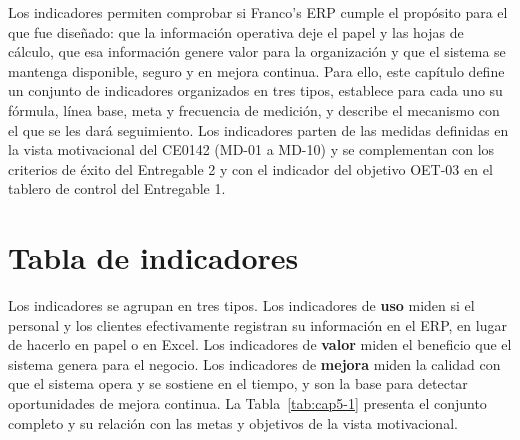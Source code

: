 
Los indicadores permiten comprobar si Franco's ERP cumple el propósito para el que fue diseñado: que la información operativa deje el papel y las hojas de cálculo, que esa información genere valor para la organización y que el sistema se mantenga disponible, seguro y en mejora continua. Para ello, este capítulo define un conjunto de indicadores organizados en tres tipos, establece para cada uno su fórmula, línea base, meta y frecuencia de medición, y describe el mecanismo con el que se les dará seguimiento. Los indicadores parten de las medidas definidas en la vista motivacional del CE0142 (MD-01 a MD-10) y se complementan con los criterios de éxito del Entregable 2 y con el indicador del objetivo OET-03 en el tablero de control del Entregable 1.

\section{Tabla de indicadores}


Los indicadores se agrupan en tres tipos. Los indicadores de \textbf{uso} miden si el personal y los clientes efectivamente registran su información en el ERP, en lugar de hacerlo en papel o en Excel. Los indicadores de \textbf{valor} miden el beneficio que el sistema genera para el negocio. Los indicadores de \textbf{mejora} miden la calidad con que el sistema opera y se sostiene en el tiempo, y son la base para detectar oportunidades de mejora continua. La Tabla~\ref{tab:cap5-1} presenta el conjunto completo y su relación con las metas y objetivos de la vista motivacional.


